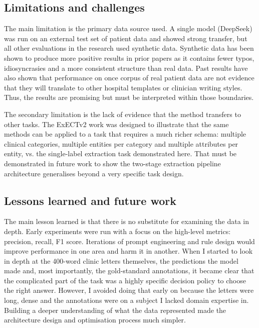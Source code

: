 \documentclass[conference]{IEEEtran}
\begin{document}
\subsection{Limitations and challenges}

The main limitation is the primary data source used. A single model (DeepSeek)
was run on an external test set of patient data and showed strong transfer, but all other 
evaluations in the research used synthetic data. Synthetic data has been shown
to produce more positive results in prior papers as it contains fewer typos, 
idiosyncrasies and a more consistent structure than real data. Past results have also
shown that performance on once corpus of real patient data are not evidence that
they will translate to other hospital templates or clinician writing styles. Thus, 
the results are promising but must be interpreted within those boundaries.

The secondary limitation is the lack of evidence that the method transfers to
other tasks. The ExECTv2 work was designed to illustrate that the same methods
can be applied to a task that requires a much richer schema: multiple clinical 
categories, multiple entities per category and multiple attributes per entity, vs.
the single-label extraction task demonstrated here. That must be demonstrated 
in future work to show the two-stage extraction pipeline architecture generalises
beyond a very specific task design.

\subsection{Lessons learned and future work}

The main lesson learned is that there is no substitute for examining the data
in depth. Early experiments were run with a focus on the high-level metrics:
precision, recall, F1 score. Iterations of prompt engineering and rule design 
would improve performance in one area and harm it in another. When
I started to look in depth at the 400-word clinic letters themselves, the predictions
the model made and, most importantly, the gold-standard annotations, it became
clear that the complicated part of the task was a highly specific decision policy
to choose the right answer. However, I avoided doing that early on because the
letters were long, dense and the annotations were on a subject I lacked domain
expertise in. Building a deeper understanding of what the data represented
made the architecture design and optimisation process much simpler.
\end{document}
